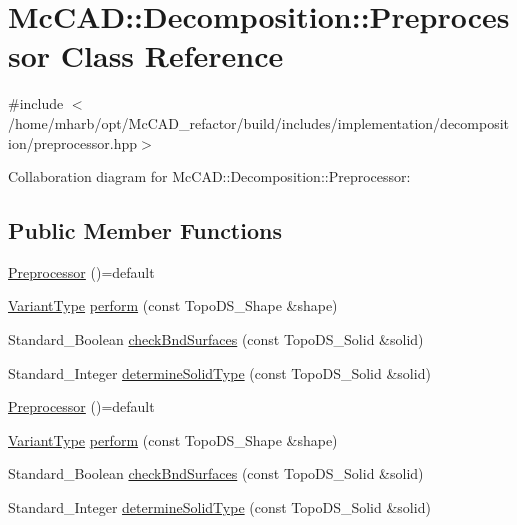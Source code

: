 \hypertarget{classMcCAD_1_1Decomposition_1_1Preprocessor}{}\section{Mc\+C\+AD\+:\+:Decomposition\+:\+:Preprocessor Class Reference}
\label{classMcCAD_1_1Decomposition_1_1Preprocessor}


{\ttfamily \#include $<$/home/mharb/opt/\+Mc\+C\+A\+D\+\_\+refactor/build/includes/implementation/decomposition/preprocessor.\+hpp$>$}



Collaboration diagram for Mc\+C\+AD\+:\+:Decomposition\+:\+:Preprocessor\+:
\subsection*{Public Member Functions}
\begin{DoxyCompactItemize}
\item 
\hyperlink{classMcCAD_1_1Decomposition_1_1Preprocessor_a8837f13271ce536e0c8a4ff607e0496f}{Preprocessor} ()=default
\item 
\hyperlink{classMcCAD_1_1Decomposition_1_1Preprocessor_a55fe8b69008632be9a000e551c3dfe90}{Variant\+Type} \hyperlink{classMcCAD_1_1Decomposition_1_1Preprocessor_af8e20922d3e63ab7efd6f559f3c978f6}{perform} (const Topo\+D\+S\+\_\+\+Shape \&shape)
\item 
Standard\+\_\+\+Boolean \hyperlink{classMcCAD_1_1Decomposition_1_1Preprocessor_a1a473424ccfb217e9bce1730e1f8a0da}{check\+Bnd\+Surfaces} (const Topo\+D\+S\+\_\+\+Solid \&solid)
\item 
Standard\+\_\+\+Integer \hyperlink{classMcCAD_1_1Decomposition_1_1Preprocessor_a6cb10d69b1bfd3351a5211c255657d62}{determine\+Solid\+Type} (const Topo\+D\+S\+\_\+\+Solid \&solid)
\item 
\hyperlink{classMcCAD_1_1Decomposition_1_1Preprocessor_a8837f13271ce536e0c8a4ff607e0496f}{Preprocessor} ()=default
\item 
\hyperlink{classMcCAD_1_1Decomposition_1_1Preprocessor_a55fe8b69008632be9a000e551c3dfe90}{Variant\+Type} \hyperlink{classMcCAD_1_1Decomposition_1_1Preprocessor_a81ce205116866f890172795c359f1dc9}{perform} (const Topo\+D\+S\+\_\+\+Shape \&shape)
\item 
Standard\+\_\+\+Boolean \hyperlink{classMcCAD_1_1Decomposition_1_1Preprocessor_a1a473424ccfb217e9bce1730e1f8a0da}{check\+Bnd\+Surfaces} (const Topo\+D\+S\+\_\+\+Solid \&solid)
\item 
Standard\+\_\+\+Integer \hyperlink{classMcCAD_1_1Decomposition_1_1Preprocessor_a6cb10d69b1bfd3351a5211c255657d62}{determine\+Solid\+Type} (const Topo\+D\+S\+\_\+\+Solid \&solid)
\end{DoxyCompactItemize}
